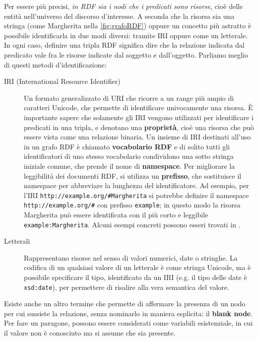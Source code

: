 \noindent
Per essere più precisi, \textit{in RDF sia i nodi che i predicati sono risorse}, cioè delle entità nell'universo del discorso d'interesse. A seconda che la risorsa sia una stringa (come Margherita nella \autoref{fig:grafoRDF}) oppure un concetto più astratto è possibile identificarla in due modi diversi: tramite IRI oppure come un letterale. In ogni caso, definire una tripla RDF significa dire che la relazione indicata dal predicato vale fra le risorse indicate dal soggetto e dall'oggetto. Parliamo meglio di questi metodi d'identificazione:
\begin{description}
	\item[IRI (International Resource Identifier)]  Un formato generalizzato di URI che ricorre a un range più ampio di caratteri Unicode, che permette di identificare univocamente una risorsa. È importante sapere che solamente gli IRI vengono utilizzati per identificare i predicati in una tripla, e denotano una \textbf{proprietà}, cioè una risorsa che può essere vista come una relazione binaria.
	Un insieme di IRI destinati all'uso in un grafo RDF è chiamato \textbf{vocabolario RDF} e di solito tutti gli identificatori di uno stesso vocabolario condividono una sotto stringa iniziale comune, che prende il nome di \textbf{namespace}. Per migliorare la leggibilità dei documenti RDF, si utilizza un \textbf{prefisso}, che sostituisce il namespace per abbreviare la lunghezza del identificatore. Ad esempio, per l'IRI \verb|http://example.org/#Margherita| si potrebbe definire il namespace\\ \verb|http://example.org/#| con prefisso \verb|example|; in questo modo la risorsa Margherita può essere identificata con il più corto e leggibile \verb|example:Margherita|. Alcuni esempi concreti possono esseri trovati in \cite{RDFSspecification}.
	\item[Letterali] Rappresentano risorse nel senso di valori numerici, date o stringhe. La codifica di un qualsiasi valore di un letterale è come stringa Unicode, ma è possibile specificare il tipo, identificato da un IRI (e.g. il tipo delle date è \verb|xsd:date|), per permettere di risalire alla vera semantica del valore.
\end{description}
Esiste anche un altro termine che permette di affermare la presenza di un nodo per cui sussiste la relazione, senza nominarlo in maniera esplicita: il \textbf{blank node}. Per fare un paragone, possono essere considerati come variabili esistenziale, in cui il valore non è conosciuto ma si assume che sia presente.

